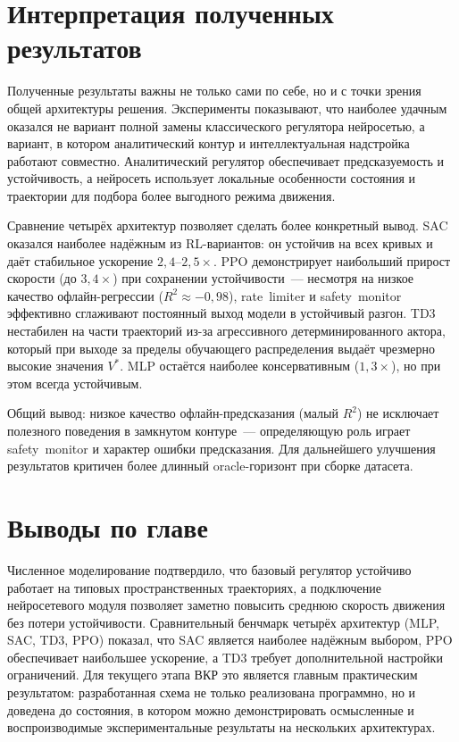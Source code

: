 \FloatBarrier

\section{Интерпретация полученных результатов}

Полученные результаты важны не только сами по себе, но и с точки зрения общей архитектуры решения. Эксперименты показывают, что наиболее удачным оказался не вариант полной замены классического регулятора нейросетью, а вариант, в котором аналитический контур и интеллектуальная надстройка работают совместно. Аналитический регулятор обеспечивает предсказуемость и устойчивость, а нейросеть использует локальные особенности состояния и траектории для подбора более выгодного режима движения.

Сравнение четырёх архитектур позволяет сделать более конкретный вывод. SAC оказался наиболее надёжным из RL-вариантов: он устойчив на всех кривых и даёт стабильное ускорение $2{,}4$--$2{,}5\times$. PPO демонстрирует наибольший прирост скорости (до $3{,}4\times$) при сохранении устойчивости~--- несмотря на низкое качество офлайн-регрессии ($R^2 \approx -0{,}98$), rate~limiter и safety~monitor эффективно сглаживают постоянный выход модели в устойчивый разгон. TD3 нестабилен на части траекторий из-за агрессивного детерминированного актора, который при выходе за пределы обучающего распределения выдаёт чрезмерно высокие значения $V^{\ast}$. MLP остаётся наиболее консервативным ($1{,}3\times$), но при этом всегда устойчивым.

Общий вывод: низкое качество офлайн-предсказания (малый $R^2$) не исключает полезного поведения в замкнутом контуре~--- определяющую роль играет safety~monitor и характер ошибки предсказания. Для дальнейшего улучшения результатов критичен более длинный oracle-горизонт при сборке датасета.

\section{Выводы по главе}

Численное моделирование подтвердило, что базовый регулятор устойчиво работает на типовых пространственных траекториях, а подключение нейросетевого модуля позволяет заметно повысить среднюю скорость движения без потери устойчивости. Сравнительный бенчмарк четырёх архитектур (MLP, SAC, TD3, PPO) показал, что SAC является наиболее надёжным выбором, PPO обеспечивает наибольшее ускорение, а TD3 требует дополнительной настройки ограничений. Для текущего этапа ВКР это является главным практическим результатом: разработанная схема не только реализована программно, но и доведена до состояния, в котором можно демонстрировать осмысленные и воспроизводимые экспериментальные результаты на нескольких архитектурах.
